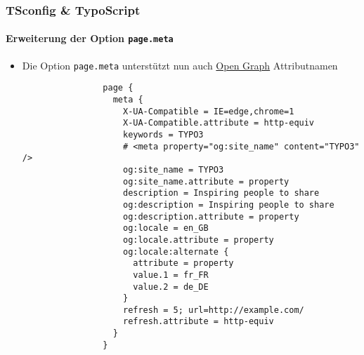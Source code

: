 \begin{frame}[fragile]
	\frametitle{TSconfig \& TypoScript}
	\framesubtitle{Erweiterung der Option \texttt{page.meta}}

	\lstset{basicstyle=\tiny\ttfamily}

	\begin{itemize}

		\item Die Option \texttt{page.meta} unterstützt nun auch \href{http://ogp.me/}{Open Graph} Attributnamen

			\begin{lstlisting}
				page {
				  meta {
				    X-UA-Compatible = IE=edge,chrome=1
				    X-UA-Compatible.attribute = http-equiv
				    keywords = TYPO3
				    # <meta property="og:site_name" content="TYPO3" />
				    og:site_name = TYPO3
				    og:site_name.attribute = property
				    description = Inspiring people to share
				    og:description = Inspiring people to share
				    og:description.attribute = property
				    og:locale = en_GB
				    og:locale.attribute = property
				    og:locale:alternate {
				      attribute = property
				      value.1 = fr_FR
				      value.2 = de_DE
				    }
				    refresh = 5; url=http://example.com/
				    refresh.attribute = http-equiv
				  }
				}
			\end{lstlisting}

	\end{itemize}

\end{frame}


